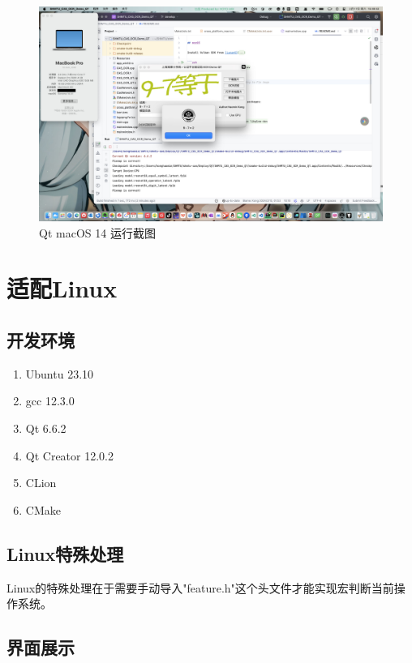 \begin{figure}
	\centering
	\includegraphics[width=0.9\linewidth]{Resources/Picture/Deploy/Qt/macOS/mac}
	\caption{Qt macOS 14 运行截图}
	\label{fig:mac}
\end{figure}

\section{适配Linux}

\subsection{开发环境}

\begin{enumerate}
	\item Ubuntu 23.10
	\item gcc 12.3.0
	\item Qt 6.6.2
	\item Qt Creator 12.0.2
	\item CLion
	\item CMake
\end{enumerate}

\subsection{Linux特殊处理}

Linux的特殊处理在于需要手动导入"feature.h"这个头文件才能实现宏判断当前操作系统。

\subsection{界面展示}


